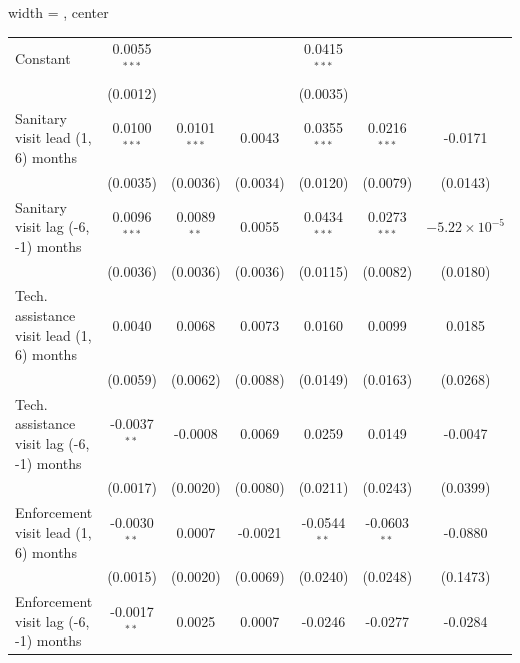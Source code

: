 \begin{table}[htbp]
\begin{adjustbox}{width = \textwidth, center}
\begin{tabular}{lcccccc}
         \midrule 
         Constant                                    & 0.0055$^{***}$  &                        &               & 0.0415$^{***}$ &                &   \\   
                                                     & (0.0012)        &                        &               & (0.0035)       &                &   \\   
         Sanitary visit lead (1, 6) months           & 0.0100$^{***}$  & 0.0101$^{***}$         & 0.0043        & 0.0355$^{***}$ & 0.0216$^{***}$ & -0.0171\\   
                                                     & (0.0035)        & (0.0036)               & (0.0034)      & (0.0120)       & (0.0079)       & (0.0143)\\   
         Sanitary visit lag (-6, -1) months          & 0.0096$^{***}$  & 0.0089$^{**}$          & 0.0055        & 0.0434$^{***}$ & 0.0273$^{***}$ & $-5.22\times 10^{-5}$\\    
                                                     & (0.0036)        & (0.0036)               & (0.0036)      & (0.0115)       & (0.0082)       & (0.0180)\\   
         Tech. assistance visit lead (1, 6) months   & 0.0040          & 0.0068                 & 0.0073        & 0.0160         & 0.0099         & 0.0185\\   
                                                     & (0.0059)        & (0.0062)               & (0.0088)      & (0.0149)       & (0.0163)       & (0.0268)\\   
         Tech. assistance visit lag (-6, -1) months  & -0.0037$^{**}$  & -0.0008                & 0.0069        & 0.0259         & 0.0149         & -0.0047\\   
                                                     & (0.0017)        & (0.0020)               & (0.0080)      & (0.0211)       & (0.0243)       & (0.0399)\\   
         Enforcement visit lead (1, 6) months        & -0.0030$^{**}$  & 0.0007                 & -0.0021       & -0.0544$^{**}$ & -0.0603$^{**}$ & -0.0880\\   
                                                     & (0.0015)        & (0.0020)               & (0.0069)      & (0.0240)       & (0.0248)       & (0.1473)\\   
         Enforcement visit lag (-6, -1) months       & -0.0017$^{**}$  & 0.0025                 & 0.0007        & -0.0246        & -0.0277        & -0.0284\\   

\end{tabular}
\end{adjustbox}
\end{table}
